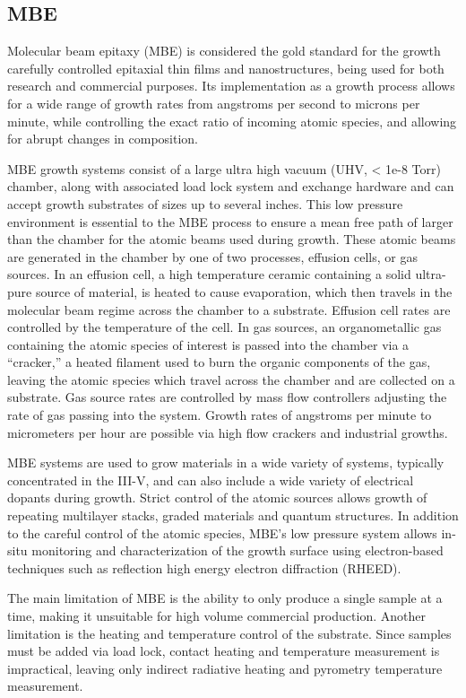\subsection{MBE}
Molecular beam epitaxy (MBE) is considered the gold standard for the growth carefully controlled epitaxial thin films and nanostructures, being used for both research and commercial purposes. Its implementation as a growth process allows for a wide range of growth rates from angstroms per second to microns per minute, while controlling the exact ratio of incoming atomic species, and allowing for abrupt changes in composition.

MBE growth systems consist of a large ultra high vacuum (UHV, < 1e-8 Torr) chamber, along with associated load lock system and exchange hardware and can accept growth substrates of sizes up to several inches. This low pressure environment is essential to the MBE process to ensure a mean free path of larger than the chamber for the atomic beams used during growth. These atomic beams are generated in the chamber by one of two processes, effusion cells, or gas sources. In an effusion cell, a high temperature ceramic containing a solid ultra-pure source of material, is heated to cause evaporation, which then travels in the molecular beam regime across the chamber to a substrate. Effusion cell rates are controlled by the temperature of the cell. In gas sources, an organometallic gas containing the atomic species of interest is passed into the chamber via a ``cracker,'' a heated filament used to burn the organic components of the gas, leaving the atomic species which travel across the chamber and are collected on a substrate. Gas source rates are controlled by mass flow controllers adjusting the rate of gas passing into the system. Growth rates of angstroms per minute to micrometers per hour are possible via high flow crackers and industrial growths.

MBE systems are used to grow materials in a wide variety of systems, typically concentrated in the III-V, and can also include a wide variety of electrical dopants during growth. Strict control of the atomic sources allows growth of repeating multilayer stacks, graded materials and quantum structures. In addition to the careful control of the atomic species, MBE's low pressure system allows in-situ monitoring and characterization of the growth surface using electron-based techniques such as reflection high energy electron diffraction (RHEED).

The main limitation of MBE is the ability to only produce a single sample at a time, making it unsuitable for high volume commercial production. Another limitation is the heating and temperature control of the substrate. Since samples must be added via load lock, contact heating and temperature measurement is impractical, leaving only indirect radiative heating and pyrometry temperature measurement.